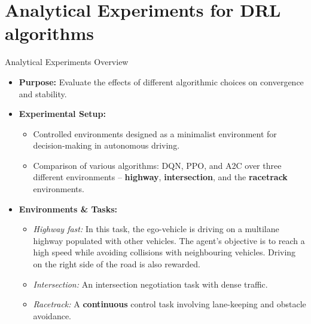 \documentclass{beamer}
\begin{document}
\section{Analytical Experiments for DRL algorithms}
\begin{frame}{Analytical Experiments Overview}
  \begin{itemize}[<+->]
    \item \textbf{Purpose:} Evaluate the effects of different algorithmic choices on convergence and stability.
    \item \textbf{Experimental Setup:}
      \begin{itemize}[<+->]
        \item Controlled environments designed as a minimalist environment for decision-making in autonomous driving.
        \item Comparison of various algorithms: DQN, PPO, and A2C over three different environments -- \textbf{highway}, \textbf{intersection}, and the \textbf{racetrack} environments.
      \end{itemize}
    \item \textbf{Environments \& Tasks:}
      \begin{itemize}
        \item<+-> \emph{Highway fast:} In this task, the ego-vehicle is driving on a multilane highway populated with other vehicles. The agent's objective is to reach a high speed while avoiding collisions with neighbouring vehicles. Driving on the right side of the road is also rewarded.
        \item<+-> \emph{Intersection:} An intersection negotiation task with dense traffic.
        \item<+-> \emph{Racetrack:} A \textbf{continuous} control task involving lane-keeping and obstacle avoidance.
      \end{itemize}
  \end{itemize}
\end{frame}
\end{document}
